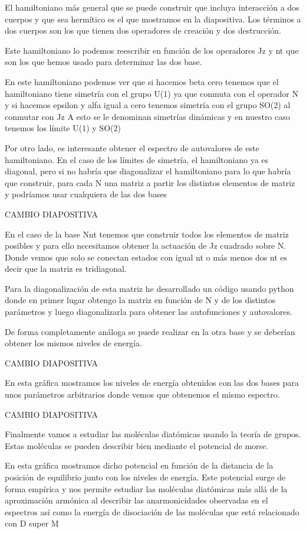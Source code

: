 \documentclass[a4paper,12pt,twoside]{article}
\begin{document}
El hamiltoniano más general que se puede construir que incluya interacción a dos cuerpos y que sea hermítico es el que mostramos en la diapositiva. Los términos a dos cuerpos son los que tienen dos operadores de creación y dos destrucción.

Este hamiltoniano lo podemos reescribir en función de los operadores Jz y nt que son los que hemos usado para determinar las dos base.

En este hamiltoniano podemos ver que si hacemos beta cero tenemos que el hamiltoniano tiene simetría con el grupo U(1) ya que conmuta con el operador N y si hacemos epsilon y alfa igual a cero tenemos simetría con el grupo SO(2) al conmutar con Jz
A esto se le denominan simetrías dinámicas y en nuestro caso tenemos los límite U(1) y SO(2) 

Por otro lado, es interesante obtener el espectro de autovalores de este hamiltoniano. En el caso de los límites de simetría, el hamiltoniano ya es diagonal, pero si no habría que diagonalizar el hamiltoniano para lo que habría que construir, para cada N una matriz a partir los distintos elementos de matriz y podríamos usar cualquiera de las dos bases 

CAMBIO DIAPOSITIVA

En el caso de la base Nnt tenemos que construir todos los elementos de matriz posibles y para ello necesitamos obtener la actuación de Jz cuadrado sobre N. Donde vemos que solo se conectan estados con igual nt o más menos dos nt es decir que la matriz es tridiagonal. 

Para la diagonalización de esta matriz he desarrollado un código usando python donde en primer lugar obtengo la matriz en función de N y de los distintos parámetros y luego diagonalizarla para obtener las autofunciones y autovalores.

De forma completamente análoga se puede realizar en la otra base y se deberían obtener los mismos niveles de energía.

CAMBIO DIAPOSITIVA

En esta gráfica mostramos los niveles de energía obtenidos con las dos bases para unos parámetros arbitrarios donde vemos que obtenemos el mismo espectro. 

CAMBIO DIAPOSITIVA

Finalmente vamos a estudiar las moléculas diatómicas usando la teoría de grupos. Estas moléculas se pueden describir bien mediante el potencial de morse. 

En esta gráfica mostramos dicho potencial en función de la distancia de la posición de equilibrio junto con los niveles de energía. Este potencial surge de forma empírica y nos permite estudiar las moléculas diatómicas más allá de la aproximación armónica al describir las anarmonicidades observadas en el espectros así como la energía de disociación de las moléculas que está relacionado con D super M
\end{document}
